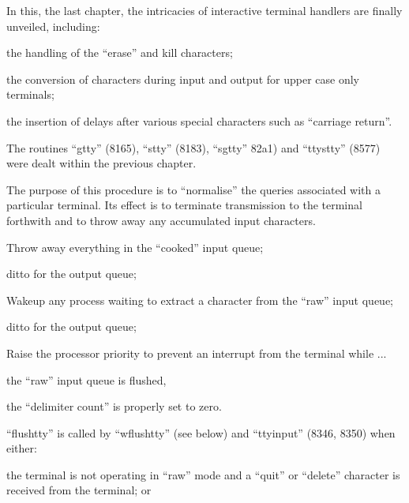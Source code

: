 %
%

In this, the last chapter, the intricacies of interactive terminal handlers
are finally unveiled, including:

\bd
\item[(a)] the handling of the ``erase'' and
kill characters;

\item[(b)] the conversion of characters
during input and output for
upper case only terminals;

\item[(c)] the insertion of delays after
various special characters such
as ``carriage return''.
\ed

The routines ``gtty'' (8165), ``stty''
(8183), ``sgtty'' 82a1) and ``ttystty''
(8577) were dealt within the previous
chapter.


The purpose of this procedure is to
``normalise'' the queries associated with
a particular terminal. Its effect is
to terminate transmission to the
terminal forthwith and to throw away any
accumulated input characters.

\bd
\item[8258:] Throw away everything in the
``cooked'' input queue;

\item[8259:] ditto for the output queue;

\item[8260:] Wakeup any process waiting to
extract a character from the
``raw'' input queue;

\item[8261:] ditto for the output queue;

\item[8263:] Raise the processor priority to
prevent an interrupt from the
terminal while ...

\item[8264:] the ``raw'' input queue is flushed,

\item[8265:] the ``delimiter count'' is properly
set to zero.
\ed

\noindent ``flushtty'' is called by ``wflushtty''
(see below) and ``ttyinput'' (8346, 8350)
when either:

\bd
\item[(a)] the terminal is not operating in
``raw'' mode and a ``quit'' or
``delete'' character is received
from the terminal; or

